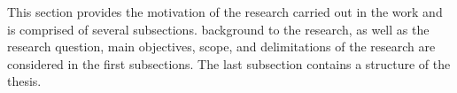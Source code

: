 %
%
This section provides the motivation of the research carried out in the work and is comprised of several subsections. 
%
\TThe background to the research, as well as the research question, \The main objectives, \The scope, and \The delimitations of the research are considered in the first subsections. 
%
The last subsection contains a structure of the thesis. 